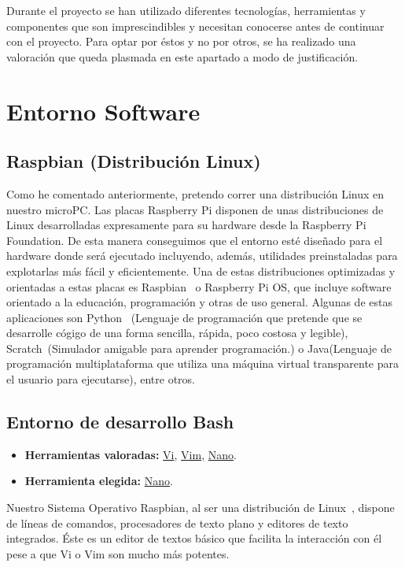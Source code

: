 
Durante el proyecto se han utilizado diferentes tecnologías, herramientas y componentes que son imprescindibles y necesitan conocerse antes de continuar con el proyecto. Para optar por éstos y no por otros, se ha realizado una valoración que queda plasmada en este apartado a modo de justificación.

\section{Entorno Software}
\subsection{Raspbian (Distribución Linux)}
Como he comentado anteriormente, pretendo correr una distribución Linux en nuestro microPC. Las placas Raspberry Pi disponen de unas distribuciones de Linux desarrolladas expresamente para su hardware desde la Raspberry Pi Foundation. De esta manera conseguimos que el entorno esté diseñado para el hardware donde será ejecutado incluyendo, además, utilidades preinstaladas para explotarlas más fácil y eficientemente. Una de estas distribuciones optimizadas y orientadas a estas placas es Raspbian~\cite{misc:RbPWeb} o Raspberry Pi OS, que incluye software orientado a la educación, programación y otras de uso general. Algunas de estas aplicaciones son Python~\cite{misc:Python} (Lenguaje de programación que pretende que se desarrolle cógigo de una forma sencilla, rápida, poco costosa y legible), Scratch~\cite{misc:Scratch}(Simulador amigable para aprender programación.) o Java\cite{misc:Java}(Lenguaje de programación multiplataforma que utiliza una máquina virtual transparente para el usuario para ejecutarse), entre otros.

\subsection{Entorno de desarrollo Bash}
\begin{itemize}
    \item \textbf{Herramientas valoradas:} \href{https://www.freebsd.org/cgi/man.cgi?query=vi&sektion=1}{Vi}, \href{https://www.vim.org/}{Vim}, \href{https://www.nano-editor.org/}{Nano}.
    \item \textbf{Herramienta elegida:} \href{https://www.nano-editor.org/}{Nano}.
\end{itemize}

Nuestro Sistema Operativo Raspbian\cite{misc:RbPWeb}, al ser una distribución de Linux~\cite{misc:Linux}, dispone de líneas de comandos, procesadores de texto plano y editores de texto integrados. Éste es un editor de textos básico que facilita la interacción con él pese a que Vi o Vim son mucho más potentes.

